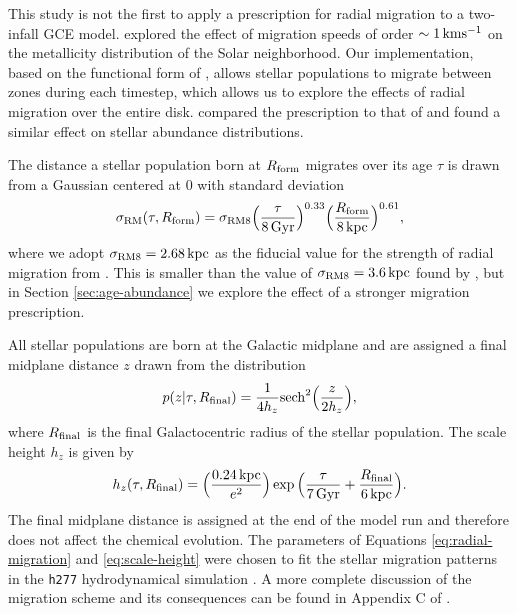\documentclass[twocolumn,twocolappendix]{aastex701}
\newcommand{\kpc}{\,{\rm kpc}}
\begin{document}
This study is not the first to apply a prescription for radial migration to a two-infall GCE model. \citet{spitoni_effect_2015} explored the effect of migration speeds of order $\sim1\,{\rm km}{\rm s}^{-1}$ on the metallicity distribution of the Solar neighborhood. 
Our implementation, based on the functional form of \citet{frankel_measuring_2018}, allows stellar populations to migrate between zones during each timestep, which allows us to explore the effects of radial migration over the entire disk. \citet{palla_mgfe_2022} compared the \citet{spitoni_effect_2015} prescription to that of \citet{frankel_measuring_2018} and found a similar effect on stellar abundance distributions.

The distance a stellar population born at $R_{\rm form}$ migrates over its age $\tau$ is drawn from a Gaussian centered at 0 with standard deviation
\begin{equation}
    \sigma_{\rm RM}(\tau,R_{\rm form}) = \sigma_{\rm RM8} \Big(\frac{\tau}{8\,{\rm Gyr}}\Big)^{0.33} \Big(\frac{R_{\rm form}}{8\kpc}\Big)^{0.61},
    \label{eq:radial-migration}
\end{equation}
where we adopt $\sigma_{\rm RM8}=2.68\kpc$ as the fiducial value for the strength of radial migration from \citet{dubay_galactic_2024}. This is smaller than the value of $\sigma_{\rm RM8}=3.6\kpc$ found by \citet{frankel_measuring_2018}, but in Section \ref{sec:age-abundance} we explore the effect of a stronger migration prescription.

All stellar populations are born at the Galactic midplane and are assigned a final midplane distance $z$ drawn from the distribution
\begin{equation}
    p(z|\tau,R_{\rm final}) = \frac{1}{4 h_z} {\rm sech}^2\Big(\frac{z}{2 h_z}\Big),
    \label{eq:sech-pdf}
\end{equation}
\citep{spitzer_dynamics_1942} where $R_{\rm final}$ is the final Galactocentric radius of the stellar population. The scale height $h_z$ is given by
\begin{equation}
    h_z(\tau,R_{\rm final}) = \Big(\frac{0.24\kpc}{e^2}\Big) \exp\Big(\frac{\tau}{7\,{\rm Gyr}} + \frac{R_{\rm final}}{6\kpc}\Big).
    \label{eq:scale-height}
\end{equation}
The final midplane distance is assigned at the end of the model run and therefore does not affect the chemical evolution. The parameters of Equations \ref{eq:radial-migration} and \ref{eq:scale-height} were chosen to fit the stellar migration patterns in the {\tt h277} hydrodynamical simulation \citep{christensen_implementing_2012}. A more complete discussion of the migration scheme and its consequences can be found in Appendix C of \citet{dubay_galactic_2024}.
\end{document}
